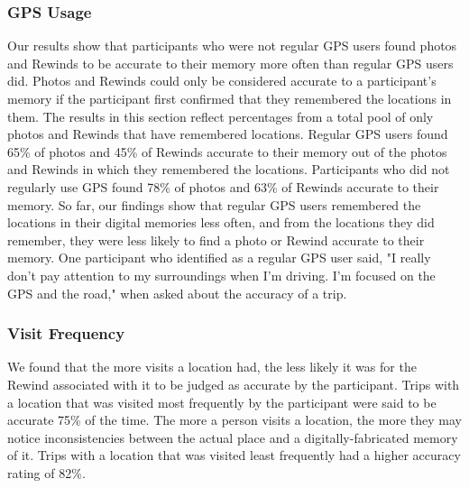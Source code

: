 \documentclass{sigchi}
\begin{document}
\subsubsection{GPS Usage}
Our results show that participants who were not regular GPS users found photos and Rewinds to be accurate to their memory more often than regular GPS users did. Photos and Rewinds could only be considered accurate to a participant's memory if the participant first confirmed that they remembered the locations in them. The results in this section reflect percentages from a total pool of only photos and Rewinds that have remembered locations. Regular GPS users found 65\% of photos and 45\% of Rewinds accurate to their memory out of the photos and Rewinds in which they remembered the locations. Participants who did not regularly use GPS found 78\% of photos and 63\% of Rewinds accurate to their memory. So far, our findings show that regular GPS users remembered the locations in their digital memories less often, and from the locations they did remember, they were less likely to find a photo or Rewind accurate to their memory. One participant who identified as a regular GPS user said, "I really don't pay attention to my surroundings when I'm driving. I'm focused on the GPS and the road," when asked about the accuracy of a trip.


\subsubsection{Visit Frequency}
We found that the more visits a location had, the less likely it was for the Rewind associated with it to be judged as accurate by the participant. Trips with a location that was visited most frequently by the participant were said to be accurate 75\% of the time. The more a person visits a location, the more they may notice inconsistencies between the actual place and a digitally-fabricated memory of it. Trips with a location that was visited least frequently had a higher accuracy rating of 82\%.
\end{document}
